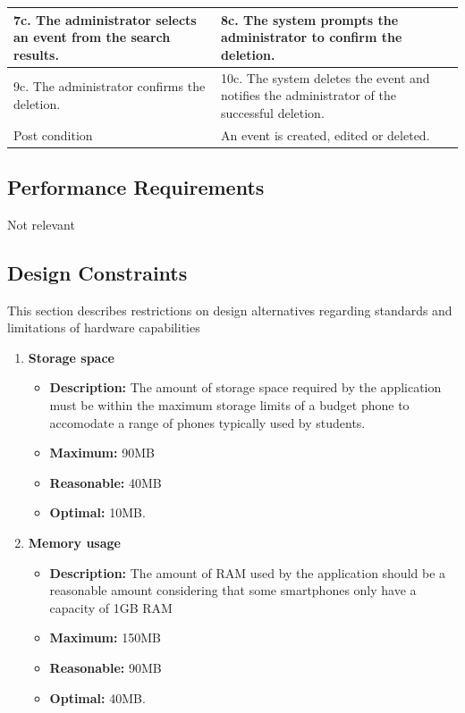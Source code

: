 \documentclass{article}
\begin{document}
\begin{enumerate}
\begin{center}
\begin{enumerate}
\begin{enumerate}
\begin{table}[H]
\begin{tabular}{ | p{15em} | p{15em}| }
		\hline
		7c. The administrator selects an event from the search results.								& 8c. The system prompts the administrator to confirm the deletion. \\
		\hline
		9c. The administrator confirms the deletion.											& 10c. The system deletes the event and notifies the administrator of the successful deletion. \\
		\hline
		Post condition															& An event is created, edited or deleted. \\
		\hline
		\end{tabular}
	\end{table}
	\end{enumerate}
\end{enumerate}
\end{center}
	
 
	\end{enumerate}
	
	\subsection{Performance Requirements}
	Not relevant
	
	\subsection{Design Constraints}
	This section describes restrictions on design alternatives regarding standards and limitations of hardware capabilities
	\begin{enumerate}
		\item \textbf{Storage space}
		\begin{itemize}
			\item \textbf{Description:} The amount of storage space required by the application must be within the maximum storage limits of a budget phone to accomodate a range of phones typically used by students.
			\item \textbf{Maximum:} 90MB
			\item \textbf{Reasonable:} 40MB
			\item \textbf{Optimal:} 10MB.\newline
		\end{itemize}
	
		\item \textbf{Memory usage}
		\begin{itemize}
			\item \textbf{Description:} The amount of RAM used by the application should be a reasonable amount considering that some smartphones only have a capacity of 1GB RAM
			\item \textbf{Maximum:} 150MB
			\item \textbf{Reasonable:} 90MB
			\item \textbf{Optimal:} 40MB.\newline
		\end{itemize}
	\end{enumerate}
	
\end{document}
